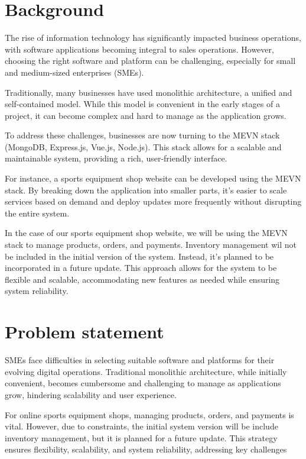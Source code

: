\section{Background}
The rise of information technology has significantly impacted business operations, with software applications becoming integral to sales operations. However, choosing the right software and platform can be challenging, especially for small and medium-sized enterprises (SMEs).

Traditionally, many businesses have used monolithic architecture, a unified and self-contained model. While this model is convenient in the early stages of a project, it can become complex and hard to manage as the application grows.

To address these challenges, businesses are now turning to the MEVN stack (MongoDB, Express.js, Vue.js, Node.js). This stack allows for a scalable and maintainable system, providing a rich, user-friendly interface.

For instance, a sports equipment shop website can be developed using the MEVN stack. By breaking down the application into smaller parts, it's easier to scale services based on demand and deploy updates more frequently without disrupting the entire system.

In the case of our sports equipment shop website, we will be using the MEVN stack to manage products, orders, and payments. Inventory management wil not be included in the initial version of the system. Instead, it's planned to be incorporated in a future update. This approach allows for the system to be flexible and scalable, accommodating new features as needed while ensuring system reliability.
\section{Problem statement}

SMEs face difficulties in selecting suitable software and platforms for their evolving digital operations. Traditional monolithic architecture, while initially convenient, becomes cumbersome and challenging to manage as applications grow, hindering scalability and user experience.

For online sports equipment shops, managing products, orders, and payments is vital. However, due to constraints, the initial system version will be include inventory management, but it is planned for a future update. This strategy ensures flexibility, scalability, and system reliability, addressing key challenges

